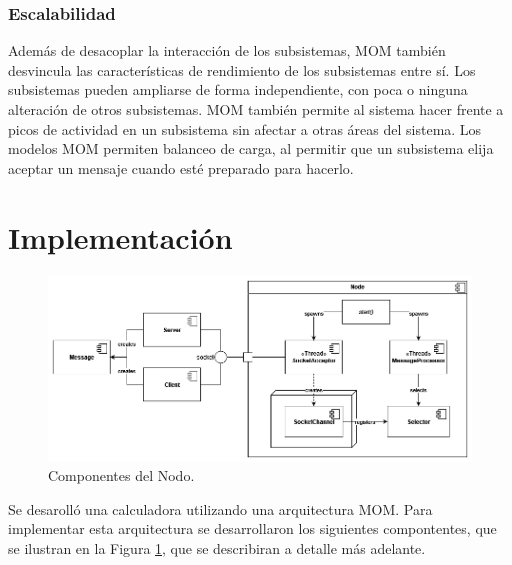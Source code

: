 \documentclass[conference,compsoc]{IEEEtran}
\begin{document}
\subsubsection{Escalabilidad}

Además de desacoplar la interacción de los subsistemas, MOM también desvincula las características de rendimiento de los subsistemas entre sí. Los subsistemas pueden ampliarse de forma independiente, con poca o ninguna alteración de otros subsistemas. MOM también permite al sistema hacer frente a picos de actividad en un subsistema sin afectar a otras áreas del sistema. Los modelos MOM permiten balanceo de carga, al permitir que un subsistema elija aceptar un mensaje cuando esté preparado para hacerlo\cite{curry_2004}.

\section{Implementación}

\begin{figure}[hbt]
    \centering
    \includegraphics[width=\columnwidth]{node_components.png}
    \caption{Componentes del Nodo.}
    \label{fig:components}
\end{figure}

Se desarolló una calculadora utilizando una arquitectura MOM. Para implementar esta arquitectura se desarrollaron los siguientes compontentes, que se ilustran en la Figura \ref{fig:components}, que se describiran a detalle más adelante.
\end{document}
